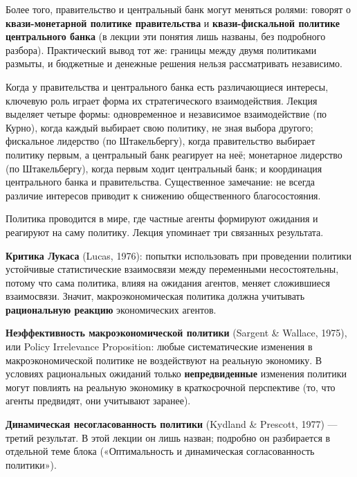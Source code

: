 \documentclass[11pt,a4paper]{article}
\begin{document}
Более того, правительство и центральный банк могут меняться ролями: говорят о \textbf{квази-монетарной политике правительства} и \textbf{квази-фискальной политике центрального банка} (в лекции эти понятия лишь названы, без подробного разбора). Практический вывод тот же: границы между двумя политиками размыты, и бюджетные и денежные решения нельзя рассматривать независимо.


Когда у правительства и центрального банка есть различающиеся интересы, ключевую роль играет форма их стратегического взаимодействия. Лекция выделяет четыре формы: одновременное и независимое взаимодействие (по Курно), когда каждый выбирает свою политику, не зная выбора другого; фискальное лидерство (по Штакельбергу), когда правительство выбирает политику первым, а центральный банк реагирует на неё; монетарное лидерство (по Штакельбергу), когда первым ходит центральный банк; и координация центрального банка и правительства. Существенное замечание: не всегда различие интересов приводит к снижению общественного благосостояния.


Политика проводится в мире, где частные агенты формируют ожидания и реагируют на саму политику. Лекция упоминает три связанных результата.

\textbf{Критика Лукаса} (Lucas, 1976): попытки использовать при проведении политики устойчивые статистические взаимосвязи между переменными несостоятельны, потому что сама политика, влияя на ожидания агентов, меняет сложившиеся взаимосвязи. Значит, макроэкономическая политика должна учитывать \textbf{рациональную реакцию} экономических агентов.

\textbf{Неэффективность макроэкономической политики} (Sargent \& Wallace, 1975), или Policy Irrelevance Proposition: любые систематические изменения в макроэкономической политике не воздействуют на реальную экономику. В условиях рациональных ожиданий только \textbf{непредвиденные} изменения политики могут повлиять на реальную экономику в краткосрочной перспективе (то, что агенты предвидят, они учитывают заранее).

\textbf{Динамическая несогласованность политики} (Kydland \& Prescott, 1977) --- третий результат. В этой лекции он лишь назван; подробно он разбирается в отдельной теме блока («Оптимальность и динамическая согласованность политики»).
\end{document}
